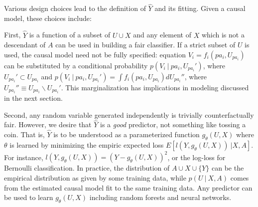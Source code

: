 Various design choices lead to the definition of $\hat Y$ and its fitting. Given a causal model, these choices include:%

First, $\hat Y$ is a function of a subset of $U \cup X$ and any
element of $X$ which is not a descendant of $A$ can be used in
building a fair classifier. If a strict subset of $U$ is used, the
causal model need not be fully specified: equation
$V_i = f_i(pa_i, U_{pa_i})$ can be substituted by a conditional
probability $p(V_i\ |\ pa_i, U_{pa_i}')$, where
$U_{pa_i}' \subset U_{pa_i}$ and
$p(V_i\ |\ pa_i, U_{pa_i}') = \int f_i(pa_i, U_{pa_i}) d U_{pa_i}''$,
where $U_{pa_i}'' \equiv U_{pa_i} \backslash U_{pa_i}'$. This
marginalization has implications in modeling discussed in the next
section.

Second, any random variable generated independently is trivially
counterfactually fair. However, we desire that $\hat Y$ is a {\it
  good} predictor, not something like tossing a coin. That is,
$\hat Y$ is to be understood as a parameterized function
$g_\theta(U, X)$ where $\theta$ is learned by minimizing the empiric
expected loss $E[l(Y, g_\theta(U, X))\ | X, A].$%
For instance, $l(Y, g_\theta(U, X)) = (Y - g_\theta(U, X))^2$, or the
log-loss for Bernoulli classification.  In practice, the distribution
of $A \cup X \cup \{Y\}$ can be the empirical distribution as given by
some training data, while $p(U\ |\ X, A)$ comes from the estimated
causal model fit to the same training data. %
Any predictor can be used to learn $g_\theta(U, X)$
including random forests and neural networks.

